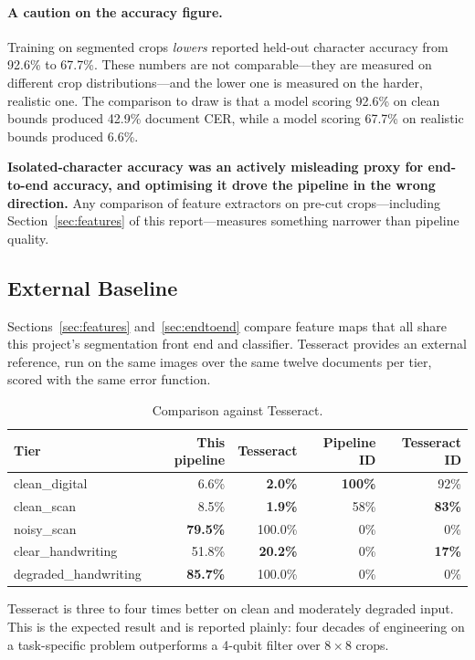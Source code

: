\documentclass[11pt,a4paper]{article}
\begin{document}
\paragraph{A caution on the accuracy figure.} Training on segmented crops
\emph{lowers} reported held-out character accuracy from 92.6\% to 67.7\%. These
numbers are not comparable---they are measured on different crop
distributions---and the lower one is measured on the harder, realistic one. The
comparison to draw is that a model scoring 92.6\% on clean bounds produced 42.9\%
document CER, while a model scoring 67.7\% on realistic bounds produced 6.6\%.

\textbf{Isolated-character accuracy was an actively misleading proxy for
end-to-end accuracy, and optimising it drove the pipeline in the wrong
direction.} Any comparison of feature extractors on pre-cut crops---including
Section~\ref{sec:features} of this report---measures something narrower than
pipeline quality.

\subsection{External Baseline}

Sections~\ref{sec:features} and~\ref{sec:endtoend} compare feature maps that all
share this project's segmentation front end and classifier. Tesseract provides an
external reference, run on the same images over the same twelve documents per
tier, scored with the same error function.

\begin{table}[h]
\centering
\caption{Comparison against Tesseract.}
\begin{tabular}{@{}lrrrr@{}}
\toprule
Tier & This pipeline & Tesseract & Pipeline ID & Tesseract ID \\
\midrule
clean\_digital & 6.6\% & \textbf{2.0\%} & \textbf{100\%} & 92\% \\
clean\_scan & 8.5\% & \textbf{1.9\%} & 58\% & \textbf{83\%} \\
noisy\_scan & \textbf{79.5\%} & 100.0\% & 0\% & 0\% \\
clear\_handwriting & 51.8\% & \textbf{20.2\%} & 0\% & \textbf{17\%} \\
degraded\_handwriting & \textbf{85.7\%} & 100.0\% & 0\% & 0\% \\
\bottomrule
\end{tabular}
\end{table}

Tesseract is three to four times better on clean and moderately degraded input.
This is the expected result and is reported plainly: four decades of engineering
on a task-specific problem outperforms a 4-qubit filter over $8\times8$ crops.
\end{document}
